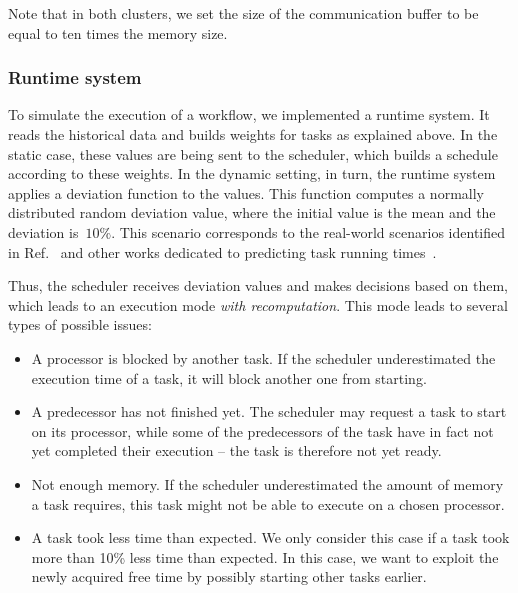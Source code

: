 \documentclass[conference]{IEEEtran}
\newcommand{\new}[1]{{#1}}
\begin{document}
Note that in both clusters, we set the size of the communication buffer to be equal
to ten times the memory size.

\medskip

\subsubsection{Runtime system}
\label{ss:runtime-sys}
%
To simulate the execution of a workflow, we implemented a runtime system.
It reads the historical data and builds weights for tasks as explained above.
In the static case, these values are being sent to the scheduler, which builds a schedule
according to these weights.
In the dynamic setting, in turn, the runtime system applies a deviation function to the values.
This function computes a normally distributed random deviation value, where the initial value
is the mean and the deviation is~$10\%$.
This scenario corresponds to the real-world scenarios identified in Ref.~\cite{lotaru} and
other works dedicated to predicting task running times~\cite{da2015online,da2013toward}.

Thus, the scheduler receives deviation values and makes decisions based on them\new{, which
leads to an execution mode  \textit{with recomputation}.}
This mode leads to several types of possible issues:
%
\begin{itemize}
\item 
  A processor is blocked by another task. If the scheduler underestimated the execution time of a task,
  it will block another one from starting.
\item 
  A predecessor has not finished yet.
  The scheduler may request a task to start on its processor, while
  some of the predecessors of the task have in fact not yet completed their execution -- 
  the task is therefore not yet ready.
\item 
  Not enough memory. If the scheduler underestimated the amount of memory a task requires, this task might not be able to execute on a chosen processor.
\item 
  A task took less time than expected. We only consider this case if a task took more than 10\% less
  time than expected. In this case, we want to exploit the newly acquired free time by possibly starting other tasks earlier.
\end{itemize}
\end{document}
